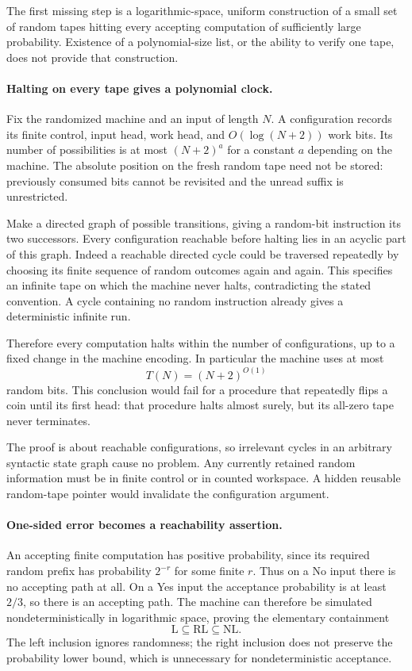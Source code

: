 \documentclass[11pt]{article}
\begin{document}
The first missing step is a logarithmic-space, uniform construction of a small set of random tapes hitting every accepting computation of sufficiently large probability. Existence of a polynomial-size list, or the ability to verify one tape, does not provide that construction.

\paragraph{Halting on every tape gives a polynomial clock.}
Fix the randomized machine and an input of length $N$. A configuration records its finite control, input head, work head, and $O(\log(N+2))$ work bits. Its number of possibilities is at most $(N+2)^a$ for a constant $a$ depending on the machine. The absolute position on the fresh random tape need not be stored: previously consumed bits cannot be revisited and the unread suffix is unrestricted.

Make a directed graph of possible transitions, giving a random-bit instruction its two successors. Every configuration reachable before halting lies in an acyclic part of this graph. Indeed a reachable directed cycle could be traversed repeatedly by choosing its finite sequence of random outcomes again and again. This specifies an infinite tape on which the machine never halts, contradicting the stated convention. A cycle containing no random instruction already gives a deterministic infinite run.

Therefore every computation halts within the number of configurations, up to a fixed change in the machine encoding. In particular the machine uses at most
\[
 T(N)=(N+2)^{O(1)}
\]
random bits. This conclusion would fail for a procedure that repeatedly flips a coin until its first head: that procedure halts almost surely, but its all-zero tape never terminates.

The proof is about reachable configurations, so irrelevant cycles in an arbitrary syntactic state graph cause no problem. Any currently retained random information must be in finite control or in counted workspace. A hidden reusable random-tape pointer would invalidate the configuration argument.

\paragraph{One-sided error becomes a reachability assertion.}
An accepting finite computation has positive probability, since its required random prefix has probability $2^{-r}$ for some finite $r$. Thus on a No input there is no accepting path at all. On a Yes input the acceptance probability is at least $2/3$, so there is an accepting path. The machine can therefore be simulated nondeterministically in logarithmic space, proving the elementary containment
\[
 \mathrm L\subseteq\mathrm{RL}\subseteq\mathrm{NL}.
\]
The left inclusion ignores randomness; the right inclusion does not preserve the probability lower bound, which is unnecessary for nondeterministic acceptance.
\end{document}
